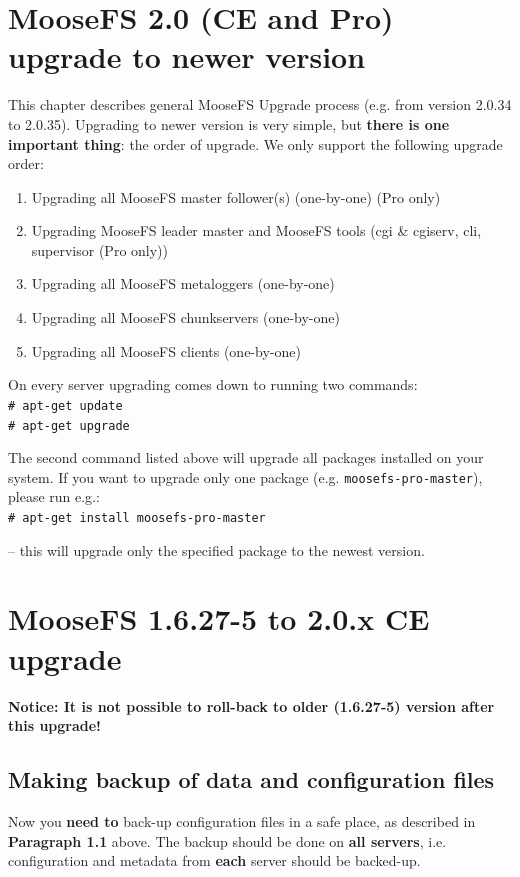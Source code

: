 \documentclass[a4paper,11pt,english]{report}
\def\code#1{\texttt{#1}}
\begin{document}
	\chapter{MooseFS 2.0 (CE and Pro) upgrade to newer version}
	This chapter describes general MooseFS Upgrade process (e.g. from version 2.0.34 to 2.0.35). Upgrading to newer version is very simple, but \textbf{there is one important thing}: the order of upgrade. We only support the following upgrade order:
	\begin{enumerate}
		\item Upgrading all MooseFS master follower(s) (one-by-one) (Pro only)
		\item Upgrading MooseFS leader master and MooseFS tools (cgi \& cgiserv, cli, supervisor (Pro only))
		\item Upgrading all MooseFS metaloggers (one-by-one)
		\item Upgrading all MooseFS chunkservers (one-by-one)
		\item Upgrading all MooseFS clients (one-by-one)
	\end{enumerate}
	
	\bigskip
	\bigskip
	On every server upgrading comes down to running two commands:\\
	\code{\# apt-get update \\
	\# apt-get upgrade}
	
	\bigskip
	\bigskip
	The second command listed above will upgrade all packages installed on your system. If you want to upgrade only one package (e.g. \code{moosefs-pro-master}), please run e.g.: \\
	\code{\# apt-get install moosefs-pro-master}
	
	-- this will upgrade only the specified package to the newest version.

	\chapter{MooseFS 1.6.27-5 to 2.0.x CE upgrade}
	\textbf{Notice: It is not possible to roll-back to older (1.6.27-5) version after this upgrade!}
	\bigskip
		
		\bigskip
		\section{Making backup of data and configuration files}
		Now you \textbf{need to} back-up configuration files in a safe place, as described in \textbf{Paragraph 1.1} above. The backup should be done on \textbf{all servers}, i.e. configuration and metadata from \textbf{each} server should be backed-up.
		
\end{document}
